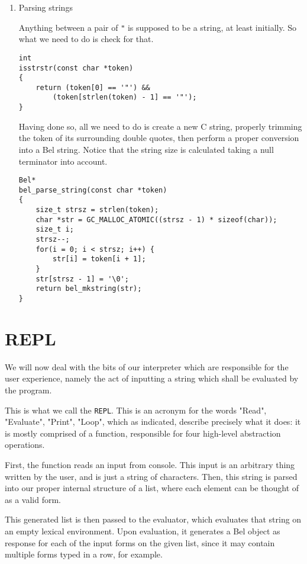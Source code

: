 \documentclass[openright,a4paper,twoside,12pt]{memoir}
\begin{document}
\begin{enumerate}
\item Parsing strings
\label{sec:orgc73ea57}

Anything between  a pair  of \texttt{"} is  supposed to be  a string,  at least
initially. So what we need to do is check for that.

\begin{verbatim}
int
isstrstr(const char *token)
{
    return (token[0] == '"') &&
        (token[strlen(token) - 1] == '"');
}
\end{verbatim}

Having done so, all  we need to do is create a  new C string, properly
trimming the  token of its  surrounding double quotes, then  perform a
proper conversion  into a Bel string.  Notice that the string  size is
calculated taking a null terminator into account.

\begin{verbatim}
Bel*
bel_parse_string(const char *token)
{
    size_t strsz = strlen(token);
    char *str = GC_MALLOC_ATOMIC((strsz - 1) * sizeof(char));
    size_t i;
    strsz--;
    for(i = 0; i < strsz; i++) {
        str[i] = token[i + 1];
    }
    str[strsz - 1] = '\0';
    return bel_mkstring(str);
}
\end{verbatim}
\end{enumerate}

\chapter{REPL}
\label{sec:orgf3fba67}

We  will  now  deal  with  the  bits  of  our  interpreter  which  are
responsible for  the user  experience, namely the  act of  inputting a
string which shall be evaluated by the program.

This  is what  we call  the \texttt{REPL}.  This is  an acronym  for the  words
"Read",  "Evaluate", "Print",  "Loop",  which  as indicated,  describe
precisely  what  it  does:  it  is mostly  comprised  of  a  function,
responsible for four high-level abstraction operations.

First, the  function reads  an input  from console.  This input  is an
arbitrary  thing  written  by  the  user, and  is  just  a  string  of
characters.  Then, this  string  is parsed  into  our proper  internal
structure of a list,  where each element can be thought  of as a valid
form.

This generated list  is then passed to the  evaluator, which evaluates
that  string on  an  empty lexical  environment.  Upon evaluation,  it
generates a Bel object as response for  each of the input forms on the
given list,  since it may contain  multiple forms typed in  a row, for
example.
\end{document}
